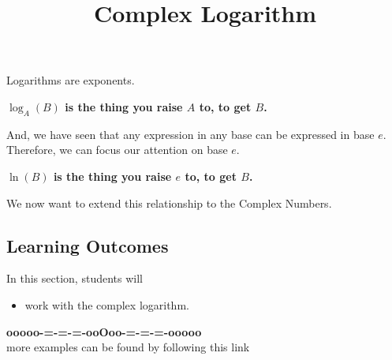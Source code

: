 \documentclass{ximera}
\title{Complex Logarithm}
\begin{document}
\begin{abstract}
%
\end{abstract}
\maketitle






Logarithms are exponents.

\begin{center}
\textbf{\textcolor{red!80!black}{$\log_A(B)$ is the thing you raise $A$ to, to get $B$.}}
\end{center}


And, we have seen that any expression in any base can be expressed in base $e$. Therefore, we can focus our attention on base $e$.



\begin{center}
\textbf{\textcolor{red!80!black}{$\ln(B)$ is the thing you raise $e$ to, to get $B$.}}
\end{center}





We now want to extend this relationship to the Complex Numbers.







\subsection*{Learning Outcomes}

\begin{sectionOutcomes}
In this section, students will 

\begin{itemize}
\item work with the complex logarithm.
\end{itemize}
\end{sectionOutcomes}
















\begin{center}
\textbf{\textcolor{green!50!black}{ooooo-=-=-=-ooOoo-=-=-=-ooooo}} \\

more examples can be found by following this link\\ 

\end{center}
\end{document}
